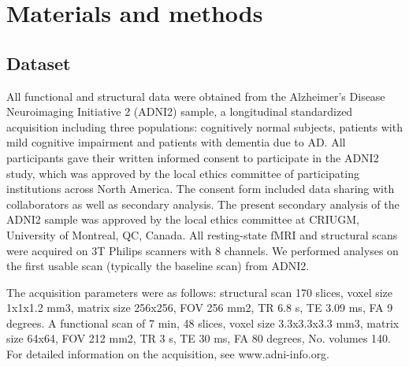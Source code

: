 \documentclass[authoryear]{elsarticle}
\begin{document}
\section{Materials and methods}


\subsection*{Dataset}
All functional and structural data were obtained from the Alzheimer's Disease Neuroimaging Initiative 2 (ADNI2) sample, a longitudinal standardized acquisition including three populations: cognitively normal subjects, patients with mild cognitive impairment and patients with dementia due to AD. All participants gave their written informed consent to participate in the ADNI2 study, which was approved by the local ethics committee of participating institutions across North America. The consent form included data sharing with collaborators as well as secondary analysis. The present secondary analysis of the ADNI2 sample was approved by the local ethics committee at CRIUGM, University of Montreal, QC, Canada. All resting-state fMRI and structural scans were acquired on 3T Philips scanners with 8 channels. We performed analyses on the first usable scan (typically the baseline scan) from ADNI2.

The acquisition parameters were as follows: structural scan 170 slices, voxel size 1x1x1.2 mm3, matrix size 256x256, FOV 256 mm2, TR 6.8 s, TE 3.09 ms, FA 9 degrees. A functional scan of 7 min, 48 slices,  voxel size 3.3x3.3x3.3 mm3, matrix size 64x64, FOV 212 mm2, TR 3 s, TE 30 ms, FA 80 degrees, No. volumes 140. For detailed information on the acquisition, see www.adni-info.org.
\end{document}
